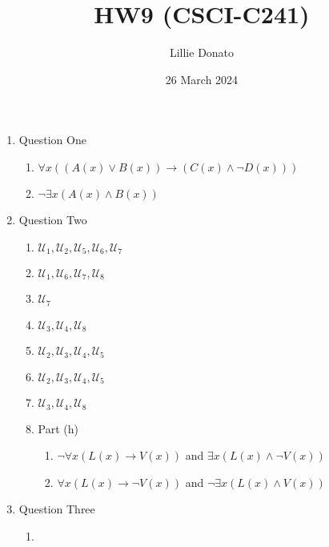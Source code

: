 \documentclass{article}
\title{HW9 (CSCI-C241)}
\author{Lillie Donato}
\date{26 March 2024}
\begin{document}
\maketitle

\begin{enumerate}
    \item Question One
    \begin{enumerate}
        \item $\forall x ((A(x) \lor B(x)) \rightarrow (C(x) \land \neg D(x)))$
        \item $\neg \exists x (A(x) \land B(x))$
    \end{enumerate}
    \item Question Two
    \begin{enumerate}
        \item $\mathcal{U}_1, \mathcal{U}_2, \mathcal{U}_5, \mathcal{U}_6, \mathcal{U}_7$
        \item $\mathcal{U}_1, \mathcal{U}_6, \mathcal{U}_7, \mathcal{U}_8$
        \item $\mathcal{U}_7$
        \item $\mathcal{U}_3, \mathcal{U}_4, \mathcal{U}_8$
        \item $\mathcal{U}_2, \mathcal{U}_3, \mathcal{U}_4, \mathcal{U}_5$
        \item $\mathcal{U}_2, \mathcal{U}_3, \mathcal{U}_4, \mathcal{U}_5$
        \item $\mathcal{U}_3, \mathcal{U}_4, \mathcal{U}_8$
        \item Part (h)
        \begin{enumerate}
            \item $\neg \forall x (L(x) \rightarrow V(x))$ and $\exists x (L(x) \land \neg V(x))$
            \item $\forall x (L(x) \rightarrow \neg V(x))$ and $\neg \exists x (L(x) \land V(x))$
        \end{enumerate}
    \end{enumerate}
    \item Question Three
    \begin{enumerate}
        \item {}
\end{enumerate}
\end{enumerate}
\end{document}
